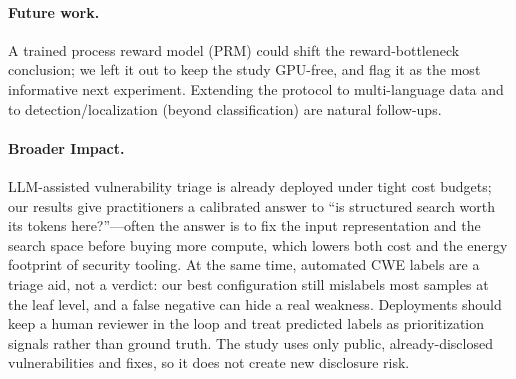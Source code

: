 \paragraph{Future work.}
A trained process reward model (PRM) could shift the reward-bottleneck
conclusion; we left it out to keep the study GPU-free, and flag it as the most
informative next experiment. Extending the protocol to multi-language data and to
detection/localization (beyond classification) are natural follow-ups.

\paragraph{Broader Impact.}
LLM-assisted vulnerability triage is already deployed under tight cost budgets;
our results give practitioners a calibrated answer to ``is structured search
worth its tokens here?''---often the answer is to fix the input representation
and the search space before buying more compute, which lowers both cost and the
energy footprint of security tooling. At the same time, automated CWE labels are
a triage aid, not a verdict: our best configuration still mislabels most
samples at the leaf level, and a false negative can hide a real weakness.
Deployments should keep a human reviewer in the loop and treat predicted labels
as prioritization signals rather than ground truth. The study uses only public,
already-disclosed vulnerabilities and fixes, so it does not create new
disclosure risk.
